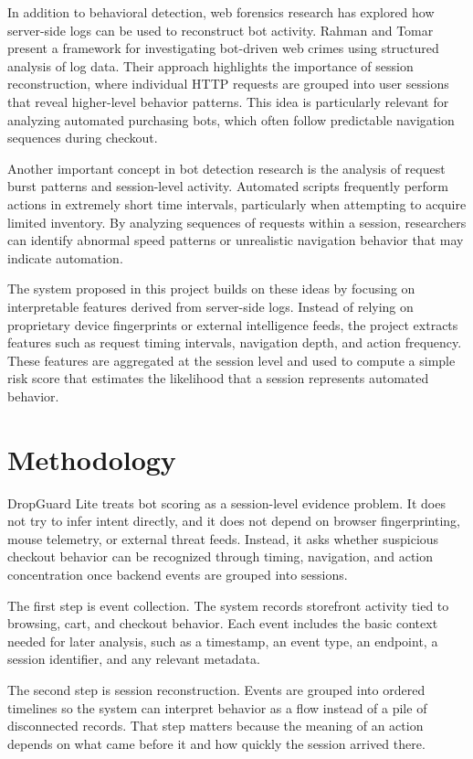 \documentclass[12pt]{article}
\begin{document}
In addition to behavioral detection, web forensics research has explored how server-side logs can be used to reconstruct bot activity. Rahman and Tomar \cite{rahman2020forensic} present a framework for investigating bot-driven web crimes using structured analysis of log data. Their approach highlights the importance of session reconstruction, where individual HTTP requests are grouped into user sessions that reveal higher-level behavior patterns. This idea is particularly relevant for analyzing automated purchasing bots, which often follow predictable navigation sequences during checkout.

Another important concept in bot detection research is the analysis of request burst patterns and session-level activity. Automated scripts frequently perform actions in extremely short time intervals, particularly when attempting to acquire limited inventory. By analyzing sequences of requests within a session, researchers can identify abnormal speed patterns or unrealistic navigation behavior that may indicate automation.

The system proposed in this project builds on these ideas by focusing on interpretable features derived from server-side logs. Instead of relying on proprietary device fingerprints or external intelligence feeds, the project extracts features such as request timing intervals, navigation depth, and action frequency. These features are aggregated at the session level and used to compute a simple risk score that estimates the likelihood that a session represents automated behavior.

\section{Methodology}

DropGuard Lite treats bot scoring as a session-level evidence problem. It does not try to infer intent directly, and it does not depend on browser fingerprinting, mouse telemetry, or external threat feeds. Instead, it asks whether suspicious checkout behavior can be recognized through timing, navigation, and action concentration once backend events are grouped into sessions.

The first step is event collection. The system records storefront activity tied to browsing, cart, and checkout behavior. Each event includes the basic context needed for later analysis, such as a timestamp, an event type, an endpoint, a session identifier, and any relevant metadata.

The second step is session reconstruction. Events are grouped into ordered timelines so the system can interpret behavior as a flow instead of a pile of disconnected records. That step matters because the meaning of an action depends on what came before it and how quickly the session arrived there.
\end{document}
